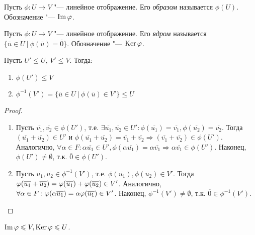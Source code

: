 \begin{definition}
	Пусть $\phi: U \rightarrow V$ "--- линейное отображение. Его \textit{образом} называется $\phi(U)$. Обозначение "--- $\operatorname{Im}{\varphi}$.
\end{definition}

\begin{definition}
	Пусть $\phi: U \rightarrow V$ "--- линейное отображение. Его \textit{ядром} называется $\{\overline{u} \in U~|~\phi(\overline{u})  = \overline{0}\}$. Обозначение "--- $\operatorname{Ker}{\varphi}$.
\end{definition}

\begin{proposition}
	Пусть $U' \le U$, $V' \le V$. Тогда:
	\begin{enumerate}
		\item $\phi(U') \le V$
		\item $\phi^{-1}(V') = \{\overline{u} \in U~|~\phi(\overline{u}) \in V'\} \le U$
	\end{enumerate}
\end{proposition}

\begin{proof}~
	\begin{enumerate}
		\item Пусть $\overline{v_1}, \overline{v_2} \in \phi(U')$, т.\:е. $\exists \overline{u_1}, \overline{u_2} \in U': \phi(\overline{u_1}) = \overline{v_1}, \phi(\overline{u_2}) = \overline{v_2}$. Тогда $(\overline{u_1} + \overline{u_2}) \in U'$ и $\phi(\overline{u_1} + \overline{u_2}) = \overline{v_1} + \overline{v_2} \Rightarrow (\overline{v_1} + \overline{v_2}) \in \phi(U')$. Аналогично, $\forall \alpha \in F: \alpha\overline{u_1} \in U', \phi(\alpha\overline{u_1}) = \alpha\overline{v_1} \Rightarrow \alpha\overline{v_1} \in \phi(U')$. Наконец, $\phi(U') \ne \emptyset$, т.\:к. $\overline{0} \in \phi(U')$.
		
		\item Пусть $\overline{u_1}, \overline{u_2} \in \phi^{-1}(V')$, т.\:е. $\phi(\overline{u_1}), \phi(\overline{u_2}) \in V'$. Тогда $\phi(\overline{u_1} \hm{+} \overline{u_2}) = \phi(\overline{u_1}) + \phi(\overline{u_2}) \in V'$. Аналогично, $\forall \alpha \in F: \phi(\alpha\overline{u_1}) \hm{=} \alpha\phi(\overline{u_1}) \in V'$. Наконец, $\phi^{-1}(V') \ne \emptyset$, т.\:к. $\overline{0} \in \phi^{-1}(V')$.
	\end{enumerate}
\end{proof}

\begin{corollary}
	$\operatorname{Im}{\varphi} \leqslant V, \operatorname{Ker}{\varphi} \leqslant U$.
\end{corollary}

